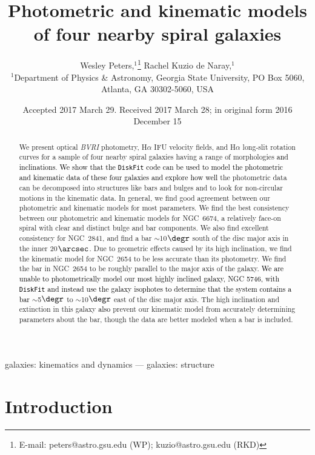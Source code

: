 \documentclass[a4paper,fleqn,usenatbib]{mnras}
\title[Structural models of spiral galaxies]{Photometric and kinematic \finalfix{DiskFit} models of four nearby spiral galaxies}
\author[W.\ Peters \& R.\ Kuzio de Naray]{
Wesley Peters,$^{1}$\thanks{E-mail: peters@astro.gsu.edu (WP); kuzio@astro.gsu.edu (RKD)}
Rachel Kuzio de Naray,$^{1}$\footnotemark[1]
\\
$^{1}$Department of Physics \& Astronomy, Georgia State University, PO Box 5060, Atlanta, GA 30302-5060, USA\\
}
\date{Accepted 2017 March 29. Received 2017 March 28; in original form 2016 December 15}
\newcommand{\authorfix}{\textcolor{black}}
\newcommand{\finalfix}{\textcolor{black}}
\begin{document}
\label{firstpage}
\pagerange{\pageref{firstpage}--\pageref{lastpage}}
\maketitle

\begin{abstract}
We present optical \textit{BVRI} photometry, H$\alpha$ IFU velocity fields, and H$\alpha$ long-slit rotation curves for a sample of four nearby spiral galaxies having a range of morphologies \authorfix{and inclinations}. \finalfix{We show that the \texttt{DiskFit} code can be used to model the photometric and kinematic data of these four galaxies and explore how well} the photometric data can be decomposed into structures like bars and bulges and to look for non-circular motions in the kinematic data. In general, we find good agreement between our photometric and kinematic models for most parameters. We find the best consistency between our photometric and kinematic models for NGC~6674, a relatively face-on spiral with clear and distinct bulge and bar components. We also find excellent consistency for NGC~2841, and find a bar $\sim$10$\degr$ south of the disc major axis in the inner 20$\arcsec$. Due to geometric effects caused by its high inclination, we find the kinematic model for NGC~2654 to be less accurate than its photometry. We find the bar in NGC~2654 to be roughly parallel to the major axis of the galaxy. \authorfix{We are unable to photometrically model our most highly inclined galaxy, NGC 5746, with \texttt{DiskFit} and instead use the galaxy isophotes to determine that the system contains a bar} $\sim$5$\degr$ to $\sim$10$\degr$ east of the disc major axis. The high inclination and extinction in this galaxy \authorfix{also} prevent our kinematic model from accurately determining parameters about the bar, though the data are better modeled when a bar is included.
\end{abstract}

\begin{keywords}
galaxies: kinematics and dynamics --- galaxies: structure
\end{keywords}



\section{Introduction}
\label{sec:intro}
\end{document}
